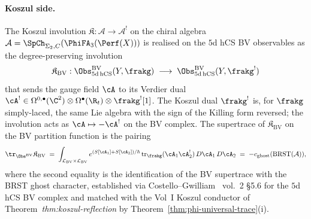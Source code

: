 \paragraph{Koszul side.}
The Koszul involution $\mathfrak{K}: \mathcal{A}\to \mathcal{A}^!$ on
the chiral algebra $\mathcal{A} = \SpCh_{\Sigma_2,C}(\PhiFA_3(\Perf(X)))$
is realised on the $5$d hCS BV observables as the degree-preserving
involution
\begin{equation}
\label{eq:koszul-involution-BV}
  \mathfrak{K}_{\mathrm{BV}}: \Obs^{\mathrm{BV}}_{5\mathrm{d\,hCS}}(Y,\frakg)
  \;\longrightarrow\; \Obs^{\mathrm{BV}}_{5\mathrm{d\,hCS}}(Y,\frakg^!)
\end{equation}
that sends the gauge field $\cA$ to its Verdier dual $\cA^! \in
\Omega^{0,\bullet}(\C^2)\otimes\Omega^\bullet(\R_t)\otimes \frakg^![1]$.
The Koszul dual $\frakg^!$ is, for $\frakg$ simply-laced, the same
Lie algebra with the sign of the Killing form reversed; the
involution acts as $\cA\mapsto -\cA^!$ on the BV complex. The supertrace
of $\mathfrak{K}_{\mathrm{BV}}$ on the BV partition function is the
pairing
\begin{equation}
\label{eq:koszul-trace-BV}
  \tr_{\Obs^{\mathrm{BV}}}\mathfrak{K}_{\mathrm{BV}}
  \;=\; \int_{\mathcal{L}_{\mathrm{BV}}\times\mathcal{L}_{\mathrm{BV}}}
  e^{(S[\cA_1] + S[\cA_2])/\hbar}\,
  \mathrm{tr}_\frakg(\cA_1\cA_2^!)\, D\cA_1\, D\cA_2
  \;=\; -c_{\mathrm{ghost}}(\mathrm{BRST}(\mathcal{A})),
\end{equation}
where the second equality is the identification of the BV supertrace
with the BRST ghost character, established via
Costello--Gwilliam~\cite{CostelloGwilliam} vol.~2 §5.6 for the
$5$d hCS BV complex and matched with the Vol~I Koszul conductor
of Theorem~\textit{thm:koszul-reflection} by
Theorem~\ref{thm:phi-universal-trace}(i).


